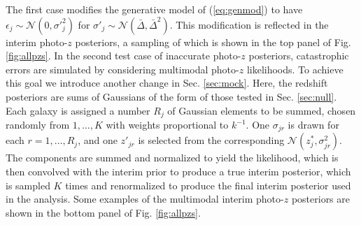 \documentclass[preprint]{aastex}
\begin{document}
The first case modifies the generative model of (\ref{eq:genmod}) to have 
$\epsilon_{j}\sim\mathcal{N}(0,\sigma'^{2}_{j})$ for 
$\sigma'_{j}\sim\mathcal{N}(\bar{\Delta},\bar{\Delta}^{2})$.  This modification 
is reflected in the interim photo-$z$ posteriors, a sampling of which is shown 
in the top panel of Fig. \ref{fig:allpzs}.  In the second test case of 
inaccurate photo-$z$ posteriors, catastrophic errors are simulated by 
considering multimodal photo-$z$ likelihoods.  To achieve this goal we 
introduce another change in Sec. \ref{sec:mock}.  Here, the redshift posteriors 
are sums of Gaussians of the form of those tested in Sec. \ref{sec:null}.  Each 
galaxy is assigned a number $R_{j}$ of Gaussian elements to be summed, chosen 
randomly from $1,\dots,K$ with weights proportional to $k^{-1}$.  One 
$\sigma_{jr}$ is drawn for each $r=1,\dots,R_{j}$, and one $z'_{jr}$ is 
selected from the corresponding $\mathcal{N}(z^{*}_{j},\sigma^{2}_{jr})$.  The 
components are summed and normalized to yield the likelihood, which is then 
convolved with the interim prior to produce a true interim posterior, which is 
sampled $K$ times and renormalized to produce the final interim posterior used 
in the analysis.  Some examples of the multimodal interim photo-$z$ posteriors 
are shown in the bottom panel of Fig. \ref{fig:allpzs}.    
\end{document}
